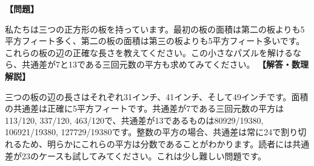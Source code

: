 \documentclass[10pt,a4paper,oneside,openany]{ltjsbook}
\begin{document}
\begin{tcolorbox}[colback=softblue,colframe=primaryblue,title=\textbf{第 128 問：平方板に関する問題 （原題: A PROBLEM IN SQUARES.）},arc=2mm,boxrule=1pt,breakable]
\textbf{【問題】}\par\vspace{0.3em}
私たちは三つの正方形の板を持っています。最初の板の面積は第二の板よりも5平方フィート多く、第二の板の面積は第三の板よりも5平方フィート多いです。これらの板の辺の正確な長さを教えてください。この小さなパズルを解けるなら、共通差が7と13である三回元数の平方も求めてみてください。
\tcblower
\textbf{【解答・数理解説】}\par\vspace{0.3em}
三つの板の辺の長さはそれぞれ31インチ、41インチ、そして49インチです。面積の共通差は正確に5平方フィートです。共通差が7である三回元数の平方は113/120, 337/120, 463/120で、共通差が13であるものは80929/19380, 106921/19380, 127729/19380です。整数の平方の場合、共通差は常に24で割り切れるため、明らかにこれらの平方は分数であることがわかります。読者には共通差が23のケースも試してみてください。これは少し難しい問題です。
\end{tcolorbox}
\end{document}
